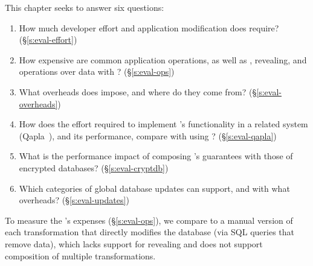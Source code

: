 This chapter seeks to answer six questions:
%
\begin{enumerate}[nosep]
 \item How much developer effort and application modification does \sys require? (\S\ref{s:eval-effort})
%
\item How expensive are common application operations, as well as
  \xxing, revealing, and operations over \xxed data with \sys? (\S\ref{s:eval-ops})

\item What overheads does \sys impose, and where do they come from?
    (\S\ref{s:eval-overheads})

\item 
    How does the effort required to implement \sys's
    functionality in a related system (Qapla~\cite{qapla}),
    and its performance, compare with using \sys?
    (\S\ref{s:eval-qapla})

\item 
    What is the performance impact of composing \sys's guarantees
    with those of encrypted databases?
        (\S\ref{s:eval-cryptdb})

\item 
    Which categories of global database updates can \sys
        support, and with what overheads? (\S\ref{s:eval-updates})
%
\end{enumerate}

To measure the \sys's expenses (\S\ref{s:eval-ops}), we compare \sys to a manual version of each
\xxing transformation that directly modifies the database (\eg via SQL queries
that remove data), which lacks support for revealing and does not support
composition of multiple transformations. 

%

%
%
%
%

